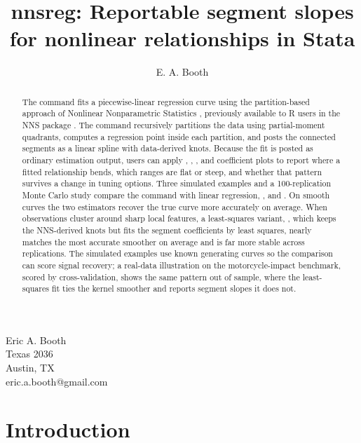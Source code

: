 \author{E. A. Booth}{%
  Eric A. Booth\\
  Texas 2036\\
  Austin, TX\\
  eric.a.booth@gmail.com
}
\title[nnsreg: Reportable segment slopes]{nnsreg: Reportable segment slopes for nonlinear relationships in Stata}
\maketitle

\begin{abstract}
The  command fits a piecewise-linear regression curve using the
partition-based approach of Nonlinear Nonparametric Statistics
\citep{viole_nawrocki_2013}, previously available to R users in the NNS
package \citep{viole_2026_nns}.  The command recursively partitions the data
using partial-moment quadrants, computes a regression point inside each
partition, and posts the connected segments as a linear spline with
data-derived knots.  Because the fit is posted as ordinary estimation output,
users can apply , , , and
coefficient plots to report where a fitted relationship bends, which ranges
are flat or steep, and whether that pattern survives a change in tuning
options.  Three simulated examples and a 100-replication Monte Carlo study
compare the command with linear regression, , and
.  On smooth curves the two 
estimators recover the true curve more accurately on average.  When
observations cluster around sharp local features, a least-squares variant,
, which keeps the NNS-derived knots but fits the segment
coefficients by least squares, nearly matches the most accurate smoother on average
and is far more stable across replications.  The simulated examples use known
generating curves so the comparison can score signal recovery; a real-data
illustration on the motorcycle-impact benchmark, scored by cross-validation,
shows the same pattern out of sample, where the least-squares fit ties the
kernel smoother and reports segment slopes it does not.

\end{abstract}

\section{Introduction}

